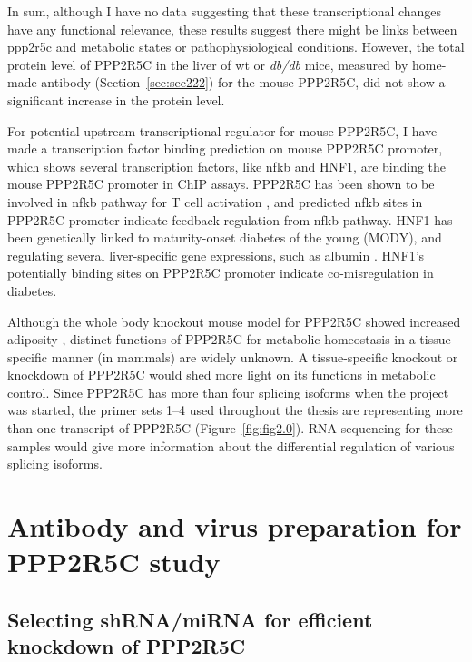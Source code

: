 In sum, although I have no data suggesting that these transcriptional changes have any functional relevance, these results suggest there might be links between \gls{ppp2r5c} and metabolic states or pathophysiological conditions. However, the total protein level of PPP2R5C in the liver of wt or \textit{db/db} mice, measured by home-made antibody (Section~\ref{sec:sec222}) for the mouse PPP2R5C, did not show a significant increase in the protein level. 

For potential upstream transcriptional regulator for mouse PPP2R5C, I have made a transcription factor binding prediction \cite{_sabiosciences_????} on mouse PPP2R5C promoter, which shows several transcription factors, like \gls{nfkb} and HNF1\textalpha{}, are binding the mouse PPP2R5C promoter in ChIP assays. PPP2R5C has been shown to be involved in \gls{nfkb} pathway for T cell activation \cite{breuer_protein_2014}, and predicted \gls{nfkb} sites in PPP2R5C promoter indicate feedback regulation from \gls{nfkb} pathway. HNF1\textalpha{} has been genetically linked to maturity-onset diabetes of the young (MODY), and regulating several liver-specific gene expressions, such as albumin \cite{owen_monogenic_2013}. HNF1\textalpha{}'s potentially binding sites on PPP2R5C promoter indicate co-misregulation in diabetes.  

Although the whole body knockout mouse model for PPP2R5C showed increased adiposity \cite{varadkar_protein_2014}, distinct functions of PPP2R5C for metabolic homeostasis in a tissue-specific manner (in mammals) are widely unknown. A tissue-specific knockout or knockdown of PPP2R5C would shed more light on its functions in metabolic control. Since PPP2R5C has more than four splicing isoforms when the project was started, the primer sets 1--4 used throughout the thesis are representing more than one transcript of PPP2R5C (Figure~\ref{fig:fig2.0}). RNA sequencing for these samples would give more information about the differential regulation of various splicing isoforms.

\section{Antibody and virus preparation for PPP2R5C study}

\subsection{Selecting shRNA/miRNA for efficient knockdown of PPP2R5C}

